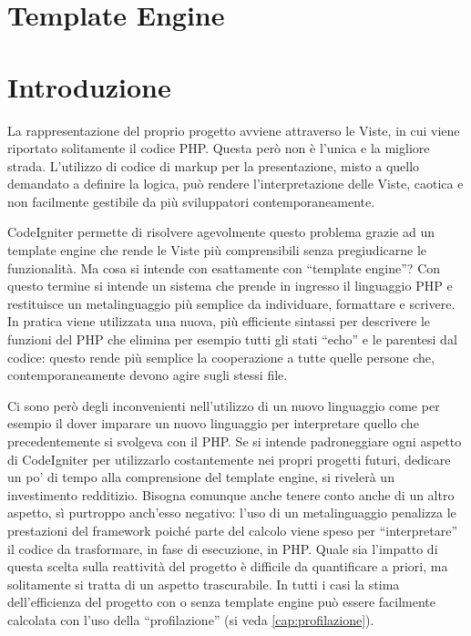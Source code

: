 \section{Template Engine}
\label{cap:template}

\section*{Introduzione}
La rappresentazione del proprio progetto avviene attraverso le Viste, in cui viene riportato solitamente il codice \ac{PHP}. Questa però non è l'unica e la migliore strada. L'utilizzo di codice di markup per la presentazione, misto a quello demandato a definire la logica, può rendere l'interpretazione delle Viste, caotica e non facilmente gestibile da più sviluppatori contemporaneamente.

CodeIgniter permette di risolvere agevolmente questo problema grazie ad un template engine che rende le Viste più comprensibili senza pregiudicarne le funzionalità. Ma cosa si intende con esattamente con ``template engine''? Con questo termine si intende un sistema che prende in ingresso il linguaggio \ac{PHP} e restituisce un metalinguaggio più semplice da individuare, formattare e scrivere. In pratica viene utilizzata una nuova, più efficiente sintassi per descrivere le funzioni del \ac{PHP} che elimina per esempio tutti gli stati ``echo'' e le parentesi dal codice: questo rende più semplice la cooperazione a tutte quelle persone che, contemporaneamente devono agire sugli stessi file.

Ci sono però degli inconvenienti nell'utilizzo di un nuovo linguaggio come per esempio il dover imparare un nuovo linguaggio per interpretare quello che precedentemente si svolgeva con il \ac{PHP}. Se si intende padroneggiare ogni aspetto di CodeIgniter per utilizzarlo costantemente nei propri progetti futuri, dedicare un po' di tempo alla comprensione del template engine, si rivelerà un investimento redditizio. Bisogna comunque anche tenere conto anche di un altro aspetto, sì purtroppo anch'esso negativo: l'uso di un metalinguaggio penalizza le prestazioni del framework poiché parte del calcolo viene speso per ``interpretare'' il codice da trasformare, in fase di esecuzione, in \ac{PHP}. Quale sia l'impatto di questa scelta sulla reattività del progetto è difficile da quantificare a priori, ma solitamente si tratta di un aspetto trascurabile. In tutti i casi la stima dell'efficienza del progetto con o senza template engine può essere facilmente calcolata con l'uso della ``profilazione'' (si veda \vref{cap:profilazione}).

